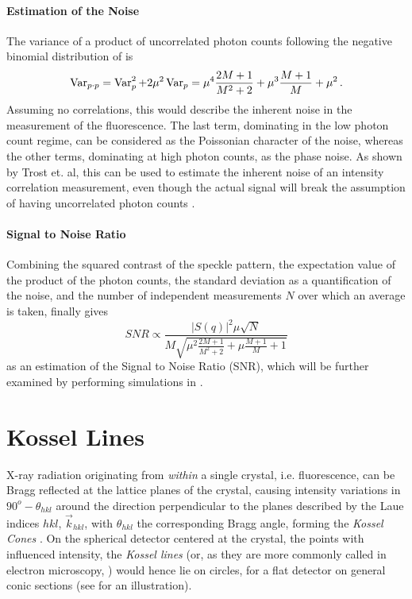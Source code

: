 \paragraph{Estimation of the Noise}
The variance of a product of uncorrelated photon counts following the negative binomial distribution of  is
\begin{equation}
	\operatorname{Var}_{p\cdot p}= \operatorname{Var}_p^2 +2 \mu^2\operatorname{Var}_p	= \mu^4 \frac{2 M + 1}{M^2 + 2}+ \mu^3 \frac{M+1}{M} + \mu^2 \,.
\end{equation}
Assuming no correlations, this would describe the inherent noise in the measurement of the fluorescence. The last term, dominating in the low photon count regime, can be considered as the Poissonian character of the noise, whereas the other terms, dominating at high photon counts, as the phase noise.
As shown by Trost et. al, this can be used to estimate the inherent noise of an intensity correlation measurement, even though the actual signal will break the assumption of having uncorrelated photon counts \cite{trost2020}.

\paragraph{Signal to Noise Ratio}
Combining the squared contrast of the speckle pattern, the expectation value of the product of the photon counts, the standard deviation as a quantification of the noise, and the number of independent measurements $N$ over which an average is taken, finally gives 
\begin{equation}
SNR\propto  \frac{|S(q)|^2 \mu\sqrt{N}}{M\sqrt{\mu^2 \frac{2 M + 1}{M^2 + 2}+ \mu \frac{M+1}{M} + 1}}
\label{eq:snr}
\end{equation}
as an estimation of the Signal to Noise Ratio (SNR), which will be further examined by performing simulations in .





\section{Kossel Lines}
\label{sec:kossel}
X-ray radiation  originating from \textit{within} a single crystal, i.e. fluorescence, can be Bragg reflected at the lattice planes of the crystal, causing intensity variations in $90^o-\theta_{hkl}$ around the direction perpendicular to the planes described by the Laue indices $hkl$, $\vec{k}_{hkl}$, with $\theta_{hkl}$ the corresponding Bragg angle, forming the \textit{Kossel Cones} \cite{cowley1995}. On the spherical detector centered at the crystal, the points with influenced intensity, the \textit{Kossel lines} (or, as they are more commonly called in electron microscopy, ) would hence lie on circles, for a flat detector on general conic sections (see  for an illustration).

